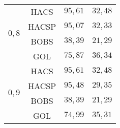 \begin{table}[H]
{\begin{tabular}{|c|c|c|c|}
    \multirow{ 4}{*}{$0,8$} & HACS & $95,61$ & $32,48$ \\
 & HACSP & $95,07$ & $32,33$ \\
 & BOBS & $38,39$ & $21,29$ \\
 & GOL & $75,87$ & $36,34$ \\ \hline
    \multirow{ 4}{*}{$0,9$} & HACS & $95,61$ & $32,48$ \\
 & HACSP & $95,48$ & $29,35$ \\
 & BOBS & $38,39$ & $21,29$ \\
 & GOL & $74,99$ & $35,31$ \\
    \hline
    \end{tabular}
    \label{tabla:intrainter}
  }
\end{table}
